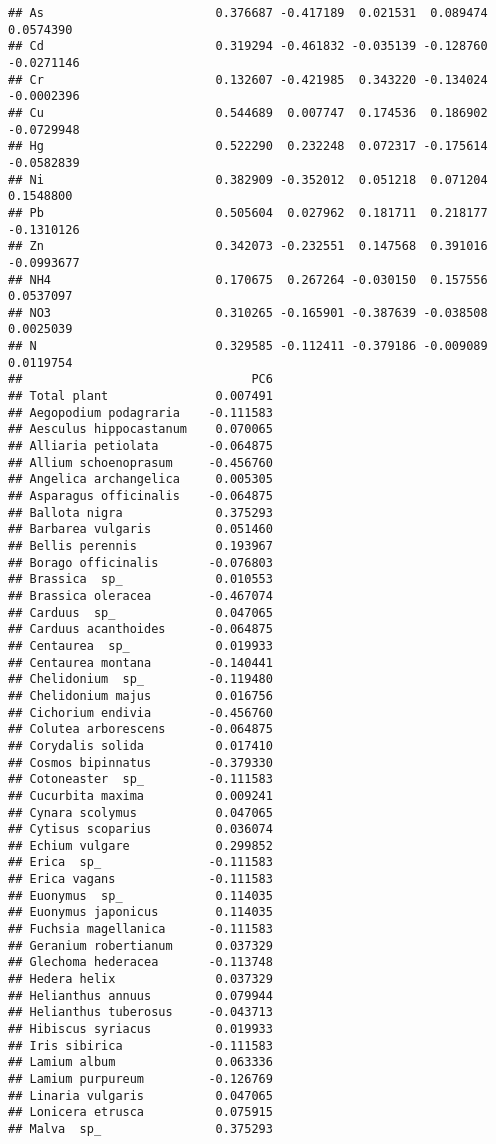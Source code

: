 \documentclass[
]{article}
\begin{document}
\begin{verbatim}
## As                        0.376687 -0.417189  0.021531  0.089474  0.0574390
## Cd                        0.319294 -0.461832 -0.035139 -0.128760 -0.0271146
## Cr                        0.132607 -0.421985  0.343220 -0.134024 -0.0002396
## Cu                        0.544689  0.007747  0.174536  0.186902 -0.0729948
## Hg                        0.522290  0.232248  0.072317 -0.175614 -0.0582839
## Ni                        0.382909 -0.352012  0.051218  0.071204  0.1548800
## Pb                        0.505604  0.027962  0.181711  0.218177 -0.1310126
## Zn                        0.342073 -0.232551  0.147568  0.391016 -0.0993677
## NH4                       0.170675  0.267264 -0.030150  0.157556  0.0537097
## NO3                       0.310265 -0.165901 -0.387639 -0.038508  0.0025039
## N                         0.329585 -0.112411 -0.379186 -0.009089  0.0119754
##                                PC6
## Total plant               0.007491
## Aegopodium podagraria    -0.111583
## Aesculus hippocastanum    0.070065
## Alliaria petiolata       -0.064875
## Allium schoenoprasum     -0.456760
## Angelica archangelica     0.005305
## Asparagus officinalis    -0.064875
## Ballota nigra             0.375293
## Barbarea vulgaris         0.051460
## Bellis perennis           0.193967
## Borago officinalis       -0.076803
## Brassica  sp_             0.010553
## Brassica oleracea        -0.467074
## Carduus  sp_              0.047065
## Carduus acanthoides      -0.064875
## Centaurea  sp_            0.019933
## Centaurea montana        -0.140441
## Chelidonium  sp_         -0.119480
## Chelidonium majus         0.016756
## Cichorium endivia        -0.456760
## Colutea arborescens      -0.064875
## Corydalis solida          0.017410
## Cosmos bipinnatus        -0.379330
## Cotoneaster  sp_         -0.111583
## Cucurbita maxima          0.009241
## Cynara scolymus           0.047065
## Cytisus scoparius         0.036074
## Echium vulgare            0.299852
## Erica  sp_               -0.111583
## Erica vagans             -0.111583
## Euonymus  sp_             0.114035
## Euonymus japonicus        0.114035
## Fuchsia magellanica      -0.111583
## Geranium robertianum      0.037329
## Glechoma hederacea       -0.113748
## Hedera helix              0.037329
## Helianthus annuus         0.079944
## Helianthus tuberosus     -0.043713
## Hibiscus syriacus         0.019933
## Iris sibirica            -0.111583
## Lamium album              0.063336
## Lamium purpureum         -0.126769
## Linaria vulgaris          0.047065
## Lonicera etrusca          0.075915
## Malva  sp_                0.375293

\end{verbatim}
\end{document}
